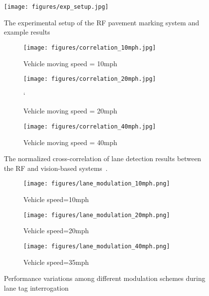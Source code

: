 \documentclass[lettersize,journal]{IEEEtran}
\begin{document}
\begin{figure*}[tb!]
\centering
\texttt{[image: figures/exp\_setup.jpg]}
\caption{The experimental setup of the RF pavement marking system and example results~\cite{suo2023rf}}
\label{fig:experiment_setup}
\end{figure*}

\begin{figure*}[tb!]
\centering
\begin{subfigure}{0.28\linewidth}
  \centering
  \texttt{[image: figures/correlation\_10mph.jpg]}
  \caption{Vehicle moving speed = 10mph}
  \label{fig:corr_10mph}
\end{subfigure}
\begin{subfigure}{0.28\linewidth}
  \centering
  \texttt{[image: figures/correlation\_20mph.jpg]}
  \caption{Vehicle moving speed = 20mph}`
  \label{fig:corr_20mph}
\end{subfigure}
\begin{subfigure}{0.28\linewidth}
  \centering
  \texttt{[image: figures/correlation\_40mph.jpg]}
  \caption{Vehicle moving speed = 40mph}
  \label{fig:corr_40mph}
\end{subfigure}
\caption{The normalized cross-correlation of lane detection results between the RF and vision-based systems~\cite{suo2023rf}.} 
\label{fig:correlation}
\end{figure*}

\begin{figure*}[tb!]
\centering
\begin{subfigure}{0.32\textwidth}
  \centering
  \texttt{[image: figures/lane\_modulation\_10mph.png]}
  \caption{Vehicle speed=10mph}
  \label{fig:lane_modulation_10mph}
\end{subfigure}
\begin{subfigure}{0.32\textwidth}
  \centering
  \texttt{[image: figures/lane\_modulation\_20mph.png]}
  \caption{Vehicle speed=20mph}
  \label{fig:lane_modulation_20mph}
\end{subfigure}
\begin{subfigure}{0.32\textwidth}
  \centering
  \texttt{[image: figures/lane\_modulation\_40mph.png]}
  \caption{Vehicle speed=35mph}
  \label{fig:lane_modulation_35mph}
\end{subfigure}
\caption{Performance variations among different modulation schemes during lane tag interrogation}
\label{fig:encoding_scheme}
\end{figure*}
\end{document}
